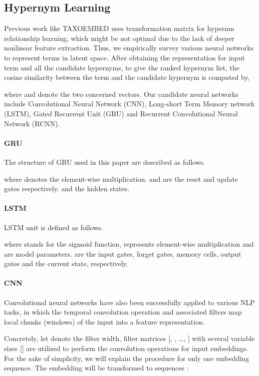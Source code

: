 \documentclass[11pt,a4paper]{article}
\begin{document}
	\subsection{Hypernym Learning}
	Previous work like TAXOEMBED \cite{Espinosa2016Supervised} uses transformation matrix for hypernm relationship learning, which might be not optimal due to the lack of deeper nonlinear feature extraction. Thus, we empirically survey various neural networks to represent terms in latent space. After obtaining the representation for input term and all the candidate hypernyms, to give the ranked hypernym list, the cosine similarity between the term and the candidate hypernym is computed by,
	 
	where  and  denote the two concerned vectors.
	Our candidate neural networks include Convolutional Neural Network (CNN), Long-short Term Memory network (LSTM), Gated Recurrent Unit (GRU) and Recurrent Convolutional Neural Network (RCNN).
	
	\paragraph{GRU} The structure of GRU \cite{Cho2014Learning} used in this paper are described as follows.
	
	where  denotes the element-wise multiplication.  and  are the reset and update gates respectively, and  the hidden states. 
	
	\paragraph{LSTM}
	LSTM \cite{Hochreiter1997Long} unit is defined as follows.
	
	where  stands for the sigmoid function,  represents element-wise multiplication and  are model parameters.  are the input gates, forget gates, memory cells, output gates and the current state, 
	respectively. 
	
	\paragraph{CNN}
	Convolutional neural networks have also been successfully applied to various NLP tasks, in which the temporal convolution operation and associated filters map local chunks (windows) of
	the input into a feature representation. 
	
	Concretely, let  denote the filter width, filter matrices [, , \dots , ] with several variable sizes  [] are utilized to perform the  convolution operations for input embeddings. For the sake of simplicity, we will explain the procedure for only one embedding sequence. The embedding will be transformed to sequences  : 
	
\end{document}
